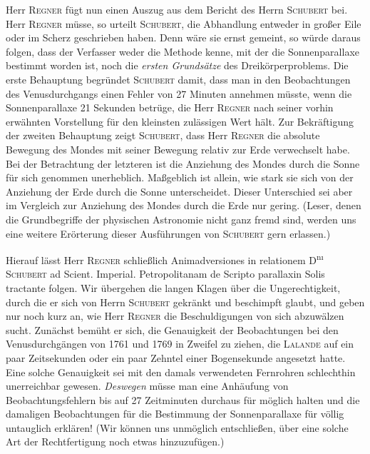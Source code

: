 Herr \textsc{Regner} fügt nun einen Auszug aus dem Bericht des Herrn \textsc{Schubert} bei. Herr \textsc{Regner} müsse, so urteilt \textsc{Schubert}, die Abhandlung entweder in großer Eile oder im Scherz geschrieben haben. Denn wäre sie ernst gemeint, so würde daraus folgen, dass der Verfasser weder die Methode kenne, mit der die Sonnenparallaxe bestimmt worden ist, noch die \emph{ersten Grundsätze} des Dreikörperproblems. Die erste Behauptung begründet \textsc{Schubert} damit, dass man in den Beobachtungen des Venusdurchgangs einen Fehler von 27 Minuten annehmen müsste, wenn die Sonnenparallaxe 21 Sekunden betrüge, die Herr \textsc{Regner} nach seiner vorhin erwähnten Vorstellung für den kleinsten zulässigen Wert hält. Zur Bekräftigung der zweiten Behauptung zeigt \textsc{Schubert}, dass Herr \textsc{Regner} die absolute Bewegung des Mondes mit seiner Bewegung relativ zur Erde verwechselt habe. Bei der Betrachtung der letzteren ist die Anziehung des Mondes durch die Sonne für sich genommen unerheblich. Maßgeblich ist allein, wie stark sie sich von der Anziehung der Erde durch die Sonne unterscheidet. Dieser Unterschied sei aber im Vergleich zur Anziehung des Mondes durch die Erde nur gering. (Leser, denen die Grundbegriffe der physischen Astronomie nicht ganz fremd sind, werden uns eine weitere Erörterung dieser Ausführungen von \textsc{Schubert} gern erlassen.)

Hierauf lässt Herr \textsc{Regner} schließlich Animadversiones in relationem D\textsuperscript{nı} \textsc{Schubert} ad Scient. Imperial. Petropolitanam de Scripto parallaxin Solis tractante folgen. Wir übergehen die langen Klagen über die Ungerechtigkeit, durch die er sich von Herrn \textsc{Schubert} gekränkt und beschimpft glaubt, und geben nur noch kurz an, wie Herr \textsc{Regner} die Beschuldigungen von sich abzuwälzen sucht. Zunächst bemüht er sich, die Genauigkeit der Beobachtungen bei den Venusdurchgängen von 1761 und 1769 in Zweifel zu ziehen, die \textsc{Lalande} auf ein paar Zeitsekunden oder ein paar Zehntel einer Bogensekunde angesetzt hatte. Eine solche Genauigkeit sei mit den damals verwendeten Fernrohren schlechthin unerreichbar gewesen. \emph{Deswegen} müsse man eine Anhäufung von Beobachtungsfehlern bis auf 27 Zeitminuten durchaus für möglich halten und die damaligen Beobachtungen für die Bestimmung der Sonnenparallaxe für völlig untauglich erklären! (Wir können uns unmöglich entschließen, über eine solche Art der Rechtfertigung noch etwas hinzuzufügen.)


